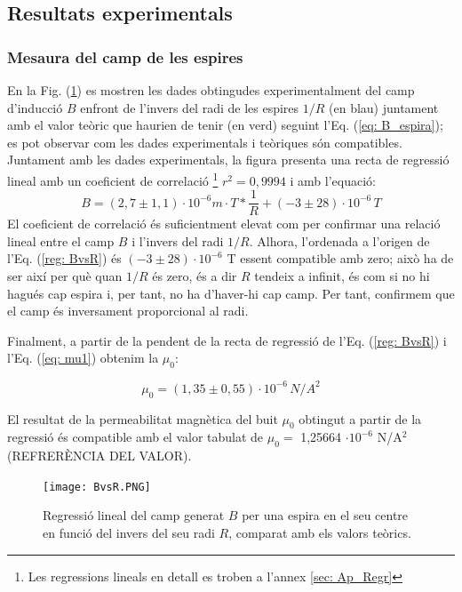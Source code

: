 \documentclass[11pt]{article}
\numberwithin{equation}{section}
\numberwithin{figure}{section}
\numberwithin{table}{section}
\begin{document}
\subsection{Resultats experimentals}\label{sec: resultats}
\subsubsection{Mesaura del camp de les espires}\label{subsec: espires}

En la Fig. (\ref{fig:BvsR}) es mostren les dades obtingudes experimentalment del camp d'inducció $B$ enfront de l'invers del radi de les espires $1/R$ (en blau) juntament amb el valor teòric que haurien de tenir (en verd) seguint l'Eq. (\ref{eq: B_espira}); es pot observar com les dades experimentals i teòriques són compatibles.
Juntament amb les dades experimentals, la figura presenta una recta de regressió lineal amb un coeficient de correlació \footnote{Les regressions lineals en detall es troben a l'annex \ref{sec: Ap_Regr}} $r^2 = 0,9994$ i amb l'equació: 
\begin{equation} \label{reg: BvsR}
    B = (2,7\pm 1,1) \cdot10^{-6} m\cdot T*\frac{1}{R}+(-3 \pm 28)\cdot10^{-6} \, T
\end{equation}
El coeficient de correlació és suficientment elevat com per confirmar una relació lineal entre el camp $B$ i l'invers del radi $1/R$.
Alhora, l'ordenada a l'origen de l'Eq. (\ref{reg: BvsR}) és $(-3 \pm 28)\cdot10^{-6}$ T essent compatible amb zero; això ha de ser així per què quan $1/R$ és zero, és a dir $R$ tendeix a infinit, és com si no hi hagués cap espira i, per tant, no ha d'haver-hi cap camp. Per tant, confirmem que el camp és inversament proporcional al radi.

Finalment, a partir de la pendent de la recta de regressió de l'Eq. (\ref{reg: BvsR}) i l'Eq. (\ref{eq: mu1}) obtenim la $\mu_0$:

\[
\boxed{\mu_0=(1,35\pm0,55)\cdot10^{-6} \, N/A^2}
\]

El resultat de la permeabilitat magnètica del buit $\mu_0$ obtingut a partir de la regressió és compatible amb el valor tabulat de $\mu_0 =$  1,25664 $\cdot 10^{-6}$ N/A$^2$ (REFRERÈNCIA DEL VALOR).

\begin{figure}[H]
    \centering
    \texttt{[image: BvsR.PNG]}
    \caption{Regressió lineal del camp generat $B$ per una espira en el seu centre en funció del invers del seu radi $R$, comparat amb els valors teòrics.}
    \label{fig:BvsR}
\end{figure}
\end{document}
